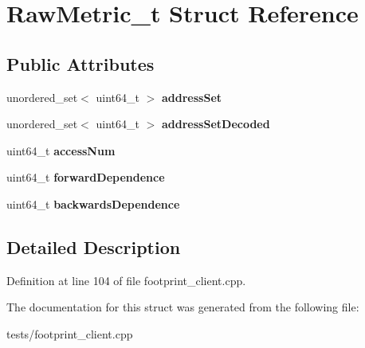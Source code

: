 \hypertarget{structRawMetric__t}{\section{Raw\-Metric\-\_\-t Struct Reference}
\label{structRawMetric__t}
}
\subsection*{Public Attributes}
\begin{DoxyCompactItemize}
\item 
\hypertarget{structRawMetric__t_af1997e64130ce247a8a9a7b06284287c}{unordered\-\_\-set$<$ uint64\-\_\-t $>$ {\bfseries address\-Set}}\label{structRawMetric__t_af1997e64130ce247a8a9a7b06284287c}

\item 
\hypertarget{structRawMetric__t_ab5f5d4f4ebc52cffc135f04e2c554054}{unordered\-\_\-set$<$ uint64\-\_\-t $>$ {\bfseries address\-Set\-Decoded}}\label{structRawMetric__t_ab5f5d4f4ebc52cffc135f04e2c554054}

\item 
\hypertarget{structRawMetric__t_a6f0dcae3cca72148920e05af46cb1485}{uint64\-\_\-t {\bfseries access\-Num}}\label{structRawMetric__t_a6f0dcae3cca72148920e05af46cb1485}

\item 
\hypertarget{structRawMetric__t_a6436f5a01d199bd7fa7cfeae6aca4c98}{uint64\-\_\-t {\bfseries forward\-Dependence}}\label{structRawMetric__t_a6436f5a01d199bd7fa7cfeae6aca4c98}

\item 
\hypertarget{structRawMetric__t_a4d29fb441fee4cae7a824cfdb1f3a664}{uint64\-\_\-t {\bfseries backwards\-Dependence}}\label{structRawMetric__t_a4d29fb441fee4cae7a824cfdb1f3a664}

\end{DoxyCompactItemize}


\subsection{Detailed Description}


Definition at line 104 of file footprint\-\_\-client.\-cpp.



The documentation for this struct was generated from the following file\-:\begin{DoxyCompactItemize}
\item 
tests/footprint\-\_\-client.\-cpp\end{DoxyCompactItemize}
